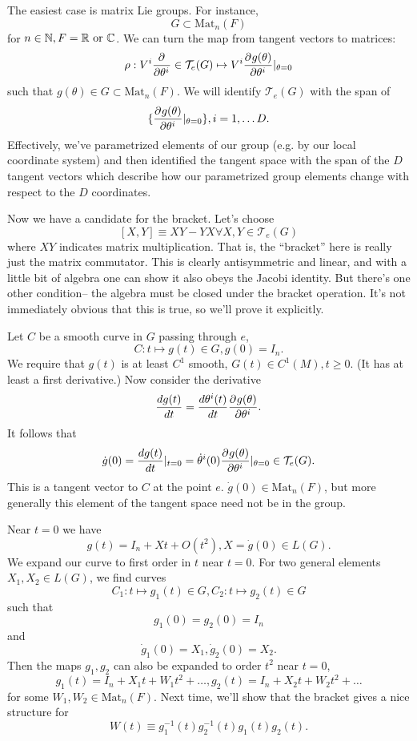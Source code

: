 \begin{exm}
The easiest case is matrix Lie groups. For instance,
$$G\subset \text{Mat}_n(F)$$
for $n\in \NN, F= \RR \text{ or } \CC$. We can turn the map from tangent vectors to matrices:
$$\rho: V^i \P{}{{\theta^i}} \in \mathcal{T}_e(G) \mapsto V^i \P{g(\theta)}{{\theta^i}} |_{\theta=0}$$
such that $g(\theta)\in G \subset \text{Mat}_n(F)$. We will identify $\mathcal{T}_e(G)$ with the span of
$$\set{\P{g(\theta)}{{\theta^i}}|_{\theta=0}},i=1,\ldots D.$$
Effectively, we've parametrized elements of our group (e.g. by our local coordinate system) and then identified the tangent space with the span of the $D$ tangent vectors which describe how our parametrized group elements change with respect to the $D$ coordinates.

Now we have a candidate for the bracket. Let's choose
$$[X,Y]\equiv XY-YX \forall X,Y \in \mathcal{T}_e(G)$$
where $XY$ indicates matrix multiplication. That is, the ``bracket'' here is really just the matrix commutator. This is clearly antisymmetric and linear, and with a little bit of algebra one can show it also obeys the Jacobi identity. But there's one other condition-- the algebra must be closed under the bracket operation. It's not immediately obvious that this is true, so we'll prove it explicitly.

Let $C$ be a smooth curve in $G$ passing through $e$,
$$C:t\mapsto g(t) \in G, g(0)= I_n.$$
We require that $g(t)$ is at least $C^1$ smooth, $G(t)\in C^1(M), t\geq 0.$ (It has at least a first derivative.) Now consider the derivative
$$\frac{dg(t)}{dt}=\frac{d\theta^i(t)}{dt}\P{g(\theta)}{{\theta^i}}.$$
It follows that
$$\dot g(0)=\frac{dg(t)}{dt}|_{t=0}=\dot \theta^i(0)\P{g(\theta)}{{\theta^i}}|_{\theta=0}\in \mathcal{T}_e(G).$$
This is a tangent vector to $C$ at the point $e$. $\dot g(0)\in \text{Mat}_n(F)$, but more generally this element of the tangent space need not be in the group. %

Near $t=0$ we have
$$g(t)=I_n+X t+ O(t^2), X= \dot g(0)\in L(G).$$
We expand our curve to first order in $t$ near $t=0$. For two general elements $X_1,X_2\in L(G)$, we find curves
$$C_1:t\mapsto g_1(t)\in G, C_2: t\mapsto g_2(t)\in G$$
such that $$g_1(0)=g_2(0)=I_n$$ and $$ \dot g_1(0)= X_1, \dot g_2(0)=X_2.$$
Then the maps $g_1,g_2$ can also be expanded to order $t^2$ near $t=0$,
$$g_1(t)=I_n+X_1 t+W_1 t^2+\ldots,g_2(t)=I_n+X_2 t+W_2 t^2+\ldots$$
for some $W_1,W_2\in \text{Mat}_n(F)$. Next time, we'll show that the bracket gives a nice structure for
$$W(t)\equiv g_1^{-1}(t) g_2^{-1}(t)g_1(t) g_2(t).$$
\end{exm}